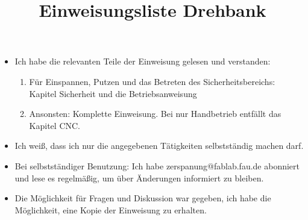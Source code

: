 \documentclass[landscape]{\basedir/fablab-document}
\title{Einweisungsliste Drehbank}
\def\tabularnewcol{&\xspace} %
\begin{document}
\setlength{\itemsep}{0em}
\begin{itemize}
\item Ich habe die relevanten Teile der Einweisung gelesen und verstanden:
	\begin{enumerate}
	\item Für Einspannen, Putzen und das Betreten des Sicherheitsbereichs:  Kapitel Sicherheit und die Betriebsanweisung
	\item Ansonsten: Komplette Einweisung. Bei nur Handbetrieb entfällt das Kapitel CNC.
	\end{enumerate}
\item Ich weiß, dass ich nur die angegebenen Tätigkeiten selbstständig machen darf.
\item Bei selbstständiger Benutzung: Ich habe zerspanung@fablab.fau.de abonniert und lese es regelmäßig, um über Änderungen informiert zu bleiben.
\item Die Möglichkeit für Fragen und Diskussion war gegeben, ich habe die Möglichkeit, eine Kopie der Einweisung zu erhalten.
\end{itemize}

\newcommand{\quer}[1]{\rotatebox{90}{\textbf{#1}\hspace{1em}}}


\setcounter{i}{1}

\newcommand{\leerezeile}{\hspace{2em} \tabularnewcol\parbox[b]{2cm}{Datum:\\[2em]gültig bis:} \tabularnewcol \parbox{5cm}{Name:\\[2em]Einweisender:\\[2em]} \tabularnewcol  \tabularnewcol\tabularnewcol  \tabularnewcol   \tabularnewline \hline}
\end{document}
